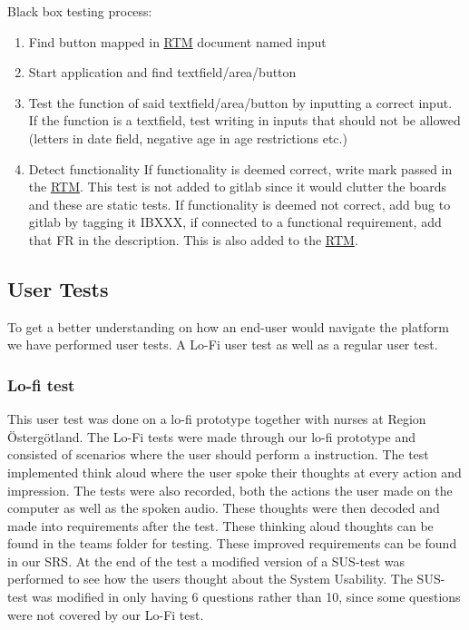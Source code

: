 Black box testing process:

\begin{enumerate}
    \item Find button mapped in \href{https://gitlab.liu.se/tddc88-company-3-2020/deploy/-/tree/Document_branch/RTM}{\underline RTM} document named input
    \item Start application and find textfield/area/button
    \item Test the function of said textfield/area/button by inputting a correct input.
    \subitem If the function is a textfield, test writing in inputs that should not be allowed (letters in date field, negative age in age restrictions etc.)
    \item Detect functionality
    \subitem If functionality is deemed correct, write mark passed in the \href{https://gitlab.liu.se/tddc88-company-3-2020/deploy/-/tree/Document_branch/RTM}{\underline RTM}. This test is not added to gitlab since it would clutter the boards and these are static tests. 
    \subitem If functionality is deemed not correct, add bug to gitlab by tagging it IBXXX, if connected to a functional requirement, add that FR in the description. This is also added to the \href{https://gitlab.liu.se/tddc88-company-3-2020/deploy/-/tree/Document_branch/RTM}{\underline RTM}.
\end{enumerate}




\subsection{User Tests}
To get a better understanding on how an end-user would navigate the platform we have performed user tests. A Lo-Fi user test as well as a regular user test.

\subsubsection{Lo-fi test}
This user test was done on a lo-fi prototype together with nurses at Region Östergötland. The Lo-Fi tests were made through our lo-fi prototype and consisted of scenarios where the user should perform a instruction. The test implemented think aloud where the user spoke their thoughts at every action and impression. The tests were also recorded, both the actions the user made on the computer as well as the spoken audio. These thoughts were then decoded and made into requirements after the test. These thinking aloud thoughts can be found in the teams folder for testing. These improved requirements can be found in our SRS. At the end of the test a modified version of a SUS-test was performed to see how the users thought about the System Usability. The SUS-test was modified in only having 6 questions rather than 10, since some questions were not covered by our Lo-Fi test.

